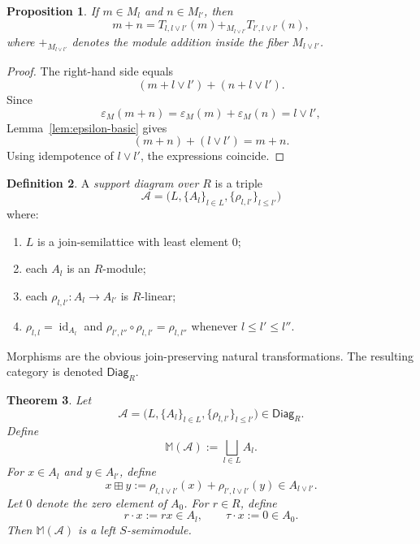 \documentclass[11pt]{amsart}
\numberwithin{equation}{section}
\newtheorem{theorem}{Theorem}[section]
\newtheorem{proposition}[theorem]{Proposition}
\theoremstyle{definition}
\newtheorem{definition}[theorem]{Definition}
\newcommand{\id}{\operatorname{id}}
\newcommand{\Diag}{\mathsf{Diag}}
\begin{document}
\begin{proposition}\label{prop:addition-via-join-fiber}
If $m\in M_l$ and $n\in M_{l'}$, then
\[
m+n
=
T_{l,l\vee l'}(m)
+_{M_{l\vee l'}}
T_{l',l\vee l'}(n),
\]
where $+_{M_{l\vee l'}}$ denotes the module addition inside the fiber $M_{l\vee l'}$.
\end{proposition}

\begin{proof}
The right-hand side equals
\[
(m+l\vee l')+(n+l\vee l').
\]
Since
\[
\varepsilon_M(m+n)=\varepsilon_M(m)+\varepsilon_M(n)=l\vee l',
\]
Lemma~\ref{lem:epsilon-basic} gives
\[
(m+n)+(l\vee l')=m+n.
\]
Using idempotence of $l\vee l'$, the expressions coincide. 
\end{proof}

\begin{definition}\label{def:support-diagram}
A \emph{support diagram over $R$} is a triple
\[
\mathcal A=\bigl(L,\{A_l\}_{l\in L},\{\rho_{l,l'}\}_{l\le l'}\bigr)
\]
where:
\begin{enumerate}[label=(\arabic*)]
    \item $L$ is a join-semilattice with least element $0$;
    \item each $A_l$ is an $R$-module;
    \item each $\rho_{l,l'}:A_l\to A_{l'}$ is $R$-linear;
    \item $\rho_{l,l}=\id_{A_l}$ and $\rho_{l',l''}\circ\rho_{l,l'}=\rho_{l,l''}$ whenever $l\le l'\le l''$.
\end{enumerate}
Morphisms are the obvious join-preserving natural transformations. The resulting category is denoted $\Diag_R$.
\end{definition}

\begin{theorem}\label{thm:reconstruct-semimodule}
Let
\[
\mathcal A=\bigl(L,\{A_l\}_{l\in L},\{\rho_{l,l'}\}_{l\le l'}\bigr)\in \Diag_R.
\]
Define
\[
\mathbb M(\mathcal A):=\bigsqcup_{l\in L}A_l.
\]
For $x\in A_l$ and $y\in A_{l'}$, define
\[
x\boxplus y:=\rho_{l,l\vee l'}(x)+\rho_{l',l\vee l'}(y)\in A_{l\vee l'}.
\]
Let $0$ denote the zero element of $A_0$. For $r\in R$, define
\[
r\cdot x:=rx\in A_l,
\qquad
\tau\cdot x:=0\in A_0.
\]
Then $\mathbb M(\mathcal A)$ is a left $S$-semimodule.
\end{theorem}
\end{document}

